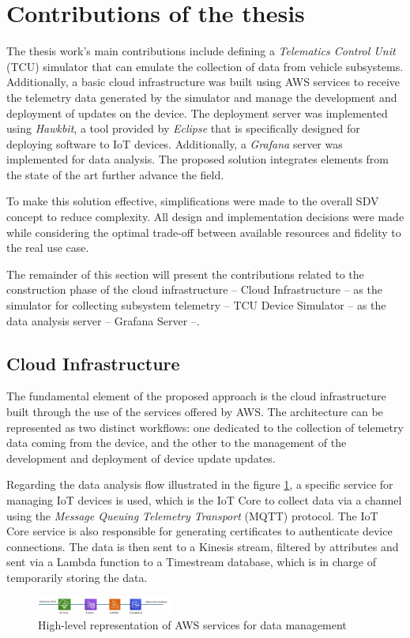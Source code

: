 \documentclass[10pt,a4paper,roman, twocolumn]{article}
\begin{document}
\section{Contributions of the thesis}
The thesis work's main contributions include defining a \textit{Telematics Control Unit} (TCU) simulator that can emulate the collection of data from vehicle subsystems. Additionally, a basic cloud infrastructure was built using AWS services to receive the telemetry data generated by the simulator and manage the development and deployment of updates on the device. The deployment server was implemented using \textit{Hawkbit}, a tool provided by \textit{Eclipse} that is specifically designed for deploying software to IoT devices. Additionally, a \textit{Grafana} server was implemented for data analysis. The proposed solution integrates elements from the state of the art further advance the field.

To make this solution effective, simplifications were made to the overall SDV concept to reduce complexity. All design and implementation decisions were made while considering the optimal trade-off between available resources and fidelity to the real use case.

The remainder of this section will present the contributions related to the construction phase of the cloud infrastructure -- Cloud Infrastructure -- as the simulator for collecting subsystem telemetry -- TCU Device Simulator -- as the data analysis server -- Grafana Server --. 

\subsection{Cloud Infrastructure}
The fundamental element of the proposed approach is the cloud infrastructure built through the use of the services offered by AWS. The architecture can be represented as two distinct workflows: one dedicated to the collection of telemetry data coming from the device, and the other to the management of the development and deployment of device update updates.

Regarding the data analysis flow illustrated in the figure \ref{fig:AWSDataServices}, a specific service for managing IoT devices is used, which is the IoT Core to collect data via a channel using the \textit{Message Queuing Telemetry Transport} (MQTT) protocol. The IoT Core service is also responsible for generating certificates to authenticate device connections. The data is then sent to a Kinesis stream, filtered by attributes and sent via a Lambda function to a Timestream database, which is in charge of temporarily storing the data.
\begin{figure} [tbh]
	\centerline{\includegraphics[width=0.4\textwidth]{images/AWS_data_services.png}}
	\caption{High-level representation of AWS services for data management}
	\label{fig:AWSDataServices}
\end{figure}
\end{document}
